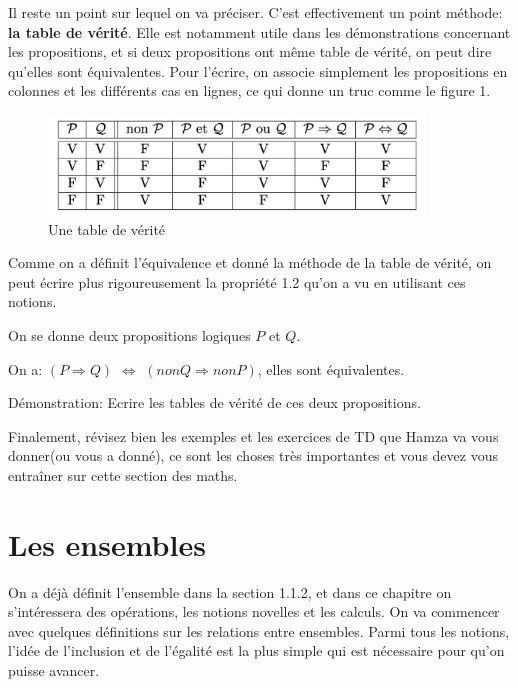 \documentclass{article}
\begin{document}
Il reste un point sur lequel on va préciser. C'est effectivement un point méthode: \textbf{la table de vérité}. Elle est notamment utile dans les démonstrations concernant les propositions, et si deux propositions ont même table de vérité, on peut dire qu'elles sont équivalentes. Pour l'écrire, on associe simplement les propositions en colonnes et les différents cas en lignes, ce qui donne un truc comme le figure 1. 

\begin{figure}[!htbp]
 \centering
 \includegraphics[width=10cm]{tabledeverite.png}
 \caption{Une table de vérité}
\end{figure}

Comme on a définit l'équivalence et donné la méthode de la table de vérité, on peut écrire plus rigoureusement la propriété 1.2 qu'on a vu en utilisant ces notions.

 \begin{tcolorbox}[colback=blue!5!white,colframe=blue!75!black,title=Propriété 1.2.2]

On se donne deux propositions logiques $P$ et $Q$. 

On a: $(P \Rightarrow Q)$ $\Leftrightarrow$ $(nonQ \Rightarrow nonP)$, elles sont équivalentes.

\tcblower

Démonstration: Ecrire les tables de vérité de ces deux propositions.

\end{tcolorbox}

Finalement, révisez bien les exemples et les exercices de TD que Hamza va vous donner(ou vous a donné), ce sont les choses très importantes et vous devez vous entraîner sur cette section des maths.

\newpage
\part{Les ensembles}

On a déjà définit l'ensemble dans la section 1.1.2, et dans ce chapitre on s'intéressera des opérations, les notions novelles et les calculs. On va commencer avec quelques définitions sur les relations entre ensembles. Parmi tous les notions, l'idée de l'inclusion et de l'égalité est la plus simple qui est nécessaire pour qu'on puisse avancer.
\end{document}
